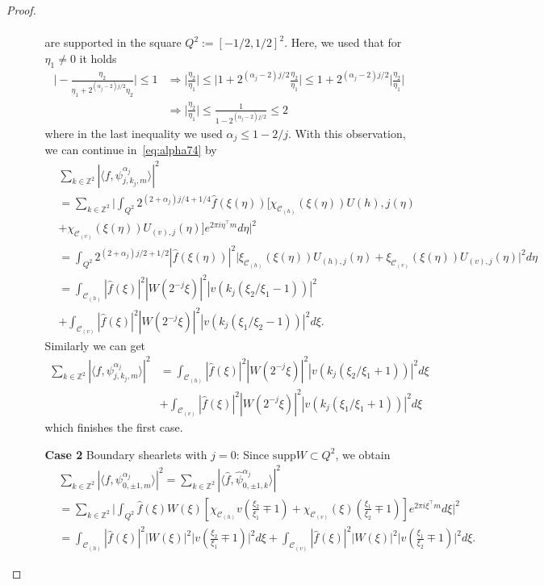 \begin{proof}
\begin{itemize}
\begin{enumerate}
$$\begin{aligned}
\end{aligned}
$$
are supported in the square $Q^2:=[-1/2,1/2]^2$. Here, we used that for $\eta_1\neq 0$ it holds
$$
\begin{aligned}
\bigg|-\frac{\eta_2}{\eta_1+2^{(\alpha_j-2)j/2}\eta_2}\bigg|\leq 1&\Longrightarrow \bigg|\frac{\eta_2}{\eta_1}\bigg|\leq \bigg| 1+2^{(\alpha_j-2)j/2}\frac{\eta_2}{\eta_1}\bigg|\leq 1+2^{(\alpha_j-2)j/2}\bigg|\frac{\eta_2}{\eta_1}\bigg|\\
&\Longrightarrow \bigg|\frac{\eta_2}{\eta_1}\bigg| \leq\frac{1}{1-2^{(\alpha_j-2)j/2}}\leq 2
\end{aligned}
$$
where in the last inequality we used $\alpha_j\leq 1-2/j$. With this observation, we can continue in~\ref{eq:alpha74} by
$$
\begin{aligned}
&\sum_{k\in\mathbb{Z}^2}|\langle f,\psi_{j,k_j,m}^{\alpha_j}\rangle|^2\\
&=\sum_{k\in\mathbb{Z}^2}\bigg|\int_{Q^2}2^{(2+\alpha_j)j/4+1/4}\hat{f}(\xi(\eta))[ \chi_{\mathcal{C}_{(h)}}(\xi(\eta))U{(h),j}(\eta)\\
&+\chi_{\mathcal{C}_{(v)}}(\xi(\eta))U_{(v),j}(\eta)]e^{2\pi i\eta^{\top}m}d\eta\bigg|^2\\
&=\int_{Q^2}2^{(2+\alpha_j)j/2+1/2}|\hat{f}(\xi(\eta))|^2\bigg|\xi_{\mathcal{C}_{(h)}}(\xi(\eta))U_{(h),j}(\eta)+\xi_{\mathcal{C}_{(v)}}(\xi(\eta))U_{(v),j}(\eta)\bigg|^2d\eta\\
&=\int_{\mathcal{C}_{(h)}}|\hat{f}(\xi)|^2|W(2^{-j}\xi)|^2|v(k_j(\xi_2/\xi_1-1))|^2\\
&+\int_{\mathcal{C}_{(v)}}|\hat{f}(\xi)|^2|W(2^{-j}\xi)|^2|v(k_j(\xi_1/\xi_2-1))|^2d\xi.
\end{aligned}
$$
Similarly we can get
$$
\begin{aligned}
\sum_{k\in\mathbb{Z}^2}|\langle f,\psi_{j,k_j,m}^{\alpha_j}\rangle|^2&=\int_{\mathcal{C}_{(h)}}|\hat{f}(\xi)|^2|W(2^{-j}\xi)|^2|v(k_j(\xi_2/\xi_1+1))|^2d\xi\\
&+\int_{\mathcal{C}_{(v)}}|\hat{f}(\xi)|^2|W(2^{-j}\xi)|^2|v(k_j(\xi_1/\xi_1+1))|^2d\xi
\end{aligned}
$$
which finishes the first case.

\item[\textbf{Case 2}] Boundary shearlets with $j=0$: Since $\text{supp}W\subset Q^2$, we obtain
$$
\begin{aligned}
&\sum_{k\in\mathbb{Z}^2}|\langle f,\psi_{0,\pm 1,m}^{\alpha_j}\rangle|^2=\sum_{k\in\mathbb{Z}^2}|\langle \hat{f},\hat{\psi}_{0,\pm 1,k}^{\alpha_j}\rangle|^2\\
&=\sum_{k\in\mathbb{Z}^2}\bigg|\int_{Q^2}\hat{f}(\xi)W(\xi)\left[\chi_{\mathcal{C}_{(h)}}v\left(\frac{\xi_2}{\xi_1}\mp 1\right) +\chi_{\mathcal{C}_{(v)}}(\xi)\left(\frac{\xi_1}{\xi_2}\mp 1\right)\right]e^{2\pi i\xi^{\top}m}d\xi\bigg|^2\\
&=\int_{\mathcal{C}_{(h)}}|\hat{f}(\xi)|^2|W(\xi)|^2\bigg| v\left(\frac{\xi_2}{\xi_1}\mp 1\right)\bigg|^2d\xi+\int_{\mathcal{C}_{(v)}}|\hat{f}(\xi)|^2|W(\xi)|^2\bigg|v\left(\frac{\xi_1}{\xi_2}\mp 1\right)\bigg|^2d\xi.
\end{aligned}
$$


\end{enumerate}
\end{itemize}
\end{proof}
